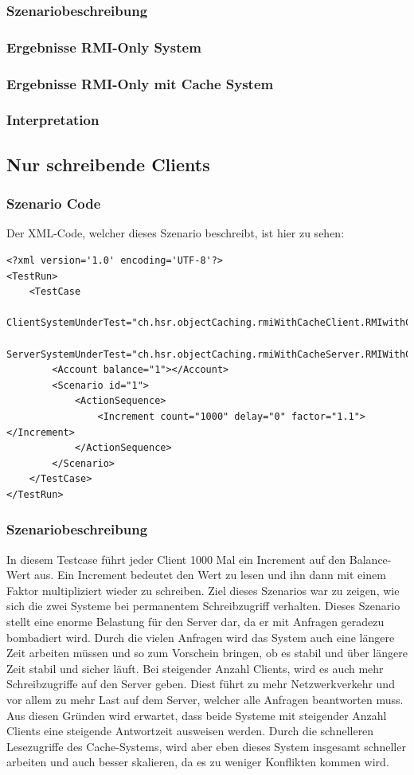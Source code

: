\subsubsection{Szenariobeschreibung}
\subsubsection{Ergebnisse RMI-Only System}
\subsubsection{Ergebnisse RMI-Only mit Cache System}
\subsubsection{Interpretation}


\subsection{Nur schreibende Clients}
\subsubsection{Szenario Code}
Der XML-Code, welcher dieses Szenario beschreibt, ist hier zu sehen:
\begin{lstlisting}
<?xml version='1.0' encoding='UTF-8'?>
<TestRun>
	<TestCase
		ClientSystemUnderTest="ch.hsr.objectCaching.rmiWithCacheClient.RMIwithCacheClientSystem"
		ServerSystemUnderTest="ch.hsr.objectCaching.rmiWithCacheServer.RMIWithCacheServerSystem">
		<Account balance="1"></Account>
		<Scenario id="1">
			<ActionSequence>
				<Increment count="1000" delay="0" factor="1.1"></Increment>
			</ActionSequence>
		</Scenario>
	</TestCase>
</TestRun>
\end{lstlisting}
\subsubsection{Szenariobeschreibung}
In diesem Testcase führt jeder Client 1000 Mal ein Increment auf den Balance-Wert aus. Ein Increment bedeutet den Wert zu lesen und ihn dann mit einem Faktor multipliziert wieder zu schreiben. \newline
Ziel dieses Szenarios war zu zeigen, wie sich die zwei Systeme bei permanentem Schreibzugriff verhalten. Dieses Szenario stellt eine enorme Belastung für den Server dar, da er mit Anfragen geradezu bombadiert wird. Durch die vielen Anfragen wird das System auch eine längere Zeit arbeiten müssen und so zum Vorschein bringen, ob es stabil und über längere Zeit stabil und sicher läuft. \newline
Bei steigender Anzahl Clients, wird es auch mehr Schreibzugriffe auf den Server geben. Diest führt zu mehr Netzwerkverkehr und vor allem zu mehr Last auf dem Server, welcher alle Anfragen beantworten muss. Aus diesen Gründen wird erwartet, dass beide Systeme mit steigender Anzahl Clients eine steigende Antwortzeit ausweisen werden. Durch die schnelleren Lesezugriffe des Cache-Systems, wird aber eben dieses System insgesamt schneller arbeiten und auch besser skalieren, da es zu weniger Konflikten kommen wird.


